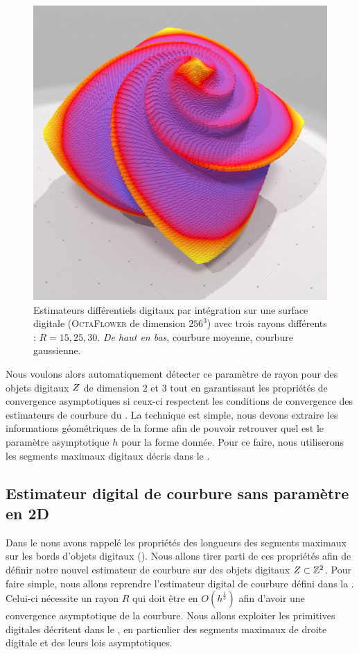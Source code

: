 \begin{figure}[ht]
\begin{center}
  \includegraphics[width=.30\linewidth]{images/Curvature/Octa256_Gauss_R_30_0001}
\end{center}\vspace{-0.5cm}
  \caption{Estimateurs différentiels digitaux par intégration sur une surface digitale (\textsc{OctaFlower} de dimension $256^3$) avec trois rayons différents : $R = 15, 25, 30$. \emph{De haut en bas}, courbure moyenne, courbure gaussienne. \label{fig:digital-II-octa-scale}}
\end{figure}

Nous voulons alors automatiquement détecter ce paramètre de rayon pour des
objets digitaux $Z$ de dimension $2$ et $3$ tout en garantissant les
propriétés de convergence asymptotiques si ceux-ci respectent les conditions de
convergence des estimateurs de courbure du .
La technique est simple, nous devons extraire les informations géométriques de
la forme afin de pouvoir retrouver quel est le paramètre asymptotique $h$ pour
la forme donnée. Pour ce faire, nous utiliserons les segments maximaux digitaux décris
dans le .
%
%
\subsection{Estimateur digital de courbure sans paramètre en 2D}

Dans le  nous avons rappelé les propriétés des
longueurs des segments maximaux sur les bords d'objets digitaux
(). Nous allons tirer parti de ces propriétés afin
de définir notre nouvel estimateur de courbure sur des objets digitaux
$Z \subset \mathbb{Z}^2$. Pour faire simple, nous allons reprendre l'estimateur
digital de courbure défini dans la .
Celui-ci nécessite un rayon $R$ qui doit être en $O(h^{\frac{1}{3}})$ afin
d'avoir une convergence asymptotique de la courbure. Nous allons exploiter les
primitives digitales décritent dans le , en particulier
des segments maximaux de droite digitale et des leurs lois asymptotiques.

